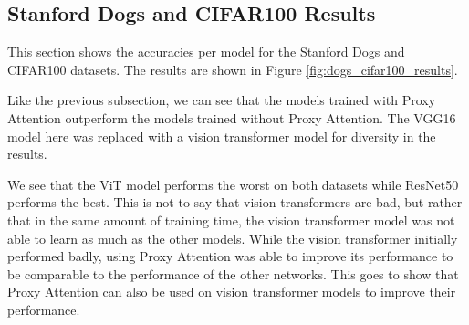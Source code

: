\documentclass[a4paper,11pt,openright]{book}
\begin{document}
\subsection{Stanford Dogs and CIFAR100 Results}
This section shows the accuracies per model for the Stanford Dogs \cite{khoslaNovelDatasetFineGrained} and CIFAR100 \cite{krizhevskyLearningMultipleLayers} datasets. The results are shown in Figure \ref{fig:dogs_cifar100_results}.

Like the previous subsection, we can see that the models trained with Proxy Attention outperform the models trained without Proxy Attention. The VGG16 model here was replaced with a vision transformer model for diversity in the results. 

We see that the ViT model performs the worst on both datasets while ResNet50 performs the best. This is not to say that vision transformers are bad, but rather that in the same amount of training time, the vision transformer model was not able to learn as much as the other models. 
While the vision transformer initially performed badly, using Proxy Attention was able to improve its performance to be comparable to the performance of the other networks. This goes to show that Proxy Attention can also be used on vision transformer models to improve their performance.
\end{document}
